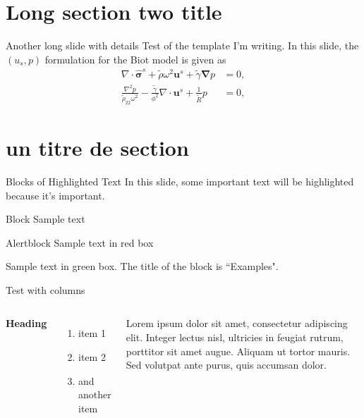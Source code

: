 \documentclass[9pt,aspectratio=169,xcolor=dvipsnames, t]{beamer}
\begin{document}
\section{Long section two title}
\begin{frame}[t]{Another long slide with details}
    Test of the template I'm writing. In this slide, the $(u_s, p)$ formulation for the Biot model is given as 
    \begin{equation}
        \begin{aligned}
            \nabla \cdot \boldsymbol{\hat{\sigma}}^s + \tilde \rho \omega^2 \boldsymbol u^s + \tilde \gamma \boldsymbol \nabla p &= 0, \\
            \frac{\nabla^2 p}{\tilde \rho_{22} \omega^2} - \frac{\tilde \gamma}{\phi^2} \nabla \cdot \boldsymbol u^s + \frac{1}{\tilde R}p &= 0,
        \end{aligned}
        \label{eq:up_motion_equations}
    \end{equation}    
\end{frame}
\section{un titre de section}
\begin{frame}{Blocks of Highlighted Text}
    In this slide, some important text will be \alert{highlighted} because it's important.
    \begin{block}{Block}
        Sample text
    \end{block}

    \begin{alertblock}{Alertblock}
        Sample text in red box
    \end{alertblock}

    \begin{examples}
        Sample text in green box. The title of the block is ``Examples".
    \end{examples}
\end{frame}

\begin{frame}[t]{Test with columns }
    \begin{columns}[c]

        \textbf{Heading}
        \begin{enumerate}
            \item item 1 
            \item item 2
            \item and another item
        \end{enumerate}

        Lorem ipsum dolor sit amet, consectetur adipiscing elit. Integer lectus nisl, ultricies in feugiat rutrum, porttitor sit amet augue. Aliquam ut tortor mauris. Sed volutpat ante purus, quis accumsan dolor.

    \end{columns}
\end{frame}
\end{document}
